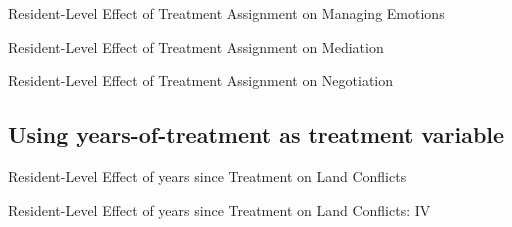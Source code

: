 \documentclass[10pt]{article}
\begin{document}
\begin{table}[H]
\caption{Resident-Level Effect of Treatment Assignment on Managing Emotions}
\begin{center}
\begin{adjustbox}{max width = \textwidth}

\end{adjustbox}
\end{center}
\end{table}

\begin{table}[H]
\caption{Resident-Level Effect of Treatment Assignment on Mediation}
\begin{center}
\begin{adjustbox}{max width = \textwidth}

\end{adjustbox}
\end{center}
\end{table}

\begin{table}[H]
\caption{Resident-Level Effect of Treatment Assignment on Negotiation}
\begin{center}
\begin{adjustbox}{max width = \textwidth}

\end{adjustbox}
\end{center}
\end{table}

\subsection{Using years-of-treatment as treatment variable}

\begin{landscape}
\begin{table}[H]
\caption{Resident-Level Effect of years since Treatment on Land Conflicts}
\begin{center}
\begin{adjustbox}{max height = .6\textheight}

\end{adjustbox}
\end{center}
\end{table}

\begin{table}[H]
\caption{Resident-Level Effect of years since Treatment on Land Conflicts: IV}
\begin{center}
\begin{adjustbox}{max width = \textwidth}

\end{adjustbox}
\end{center}
\end{table}
\end{landscape}
\end{document}

